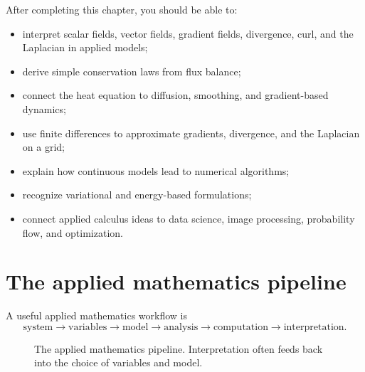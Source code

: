 \documentclass[11pt]{article}
\begin{document}
\begin{goalbox}
After completing this chapter, you should be able to:
\begin{itemize}
  \item interpret scalar fields, vector fields, gradient fields, divergence, curl, and the Laplacian in applied models;
  \item derive simple conservation laws from flux balance;
  \item connect the heat equation to diffusion, smoothing, and gradient-based dynamics;
  \item use finite differences to approximate gradients, divergence, and the Laplacian on a grid;
  \item explain how continuous models lead to numerical algorithms;
  \item recognize variational and energy-based formulations;
  \item connect applied calculus ideas to data science, image processing, probability flow, and optimization.
\end{itemize}
\end{goalbox}

\section{The applied mathematics pipeline}

A useful applied mathematics workflow is
\[
\text{system} \longrightarrow \text{variables} \longrightarrow \text{model} \longrightarrow \text{analysis} \longrightarrow \text{computation} \longrightarrow \text{interpretation}.
\]

\begin{figure}[H]
\centering
{}
\caption{The applied mathematics pipeline. Interpretation often feeds back into the choice of variables and model.}
\end{figure}
\end{document}
